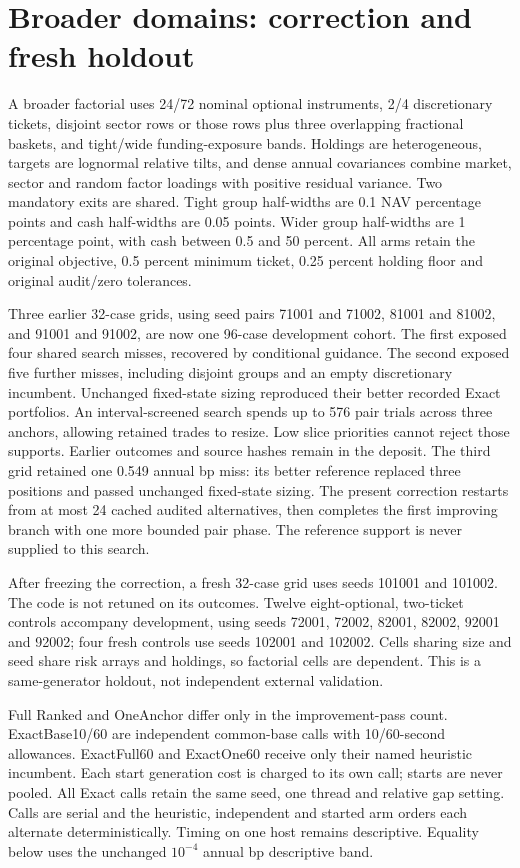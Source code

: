 \section{Broader domains: correction and fresh holdout}\label{sec:breadth}

A broader factorial uses 24/72 nominal optional instruments, 2/4 discretionary tickets, disjoint sector rows or those rows plus three overlapping fractional baskets, and tight/wide funding-exposure bands. Holdings are heterogeneous, targets are lognormal relative tilts, and dense annual covariances combine market, sector and random factor loadings with positive residual variance. Two mandatory exits are shared. Tight group half-widths are 0.1 NAV percentage points and cash half-widths are 0.05 points. Wider group half-widths are 1 percentage point, with cash between 0.5 and 50 percent. All arms retain the original objective, 0.5 percent minimum ticket, 0.25 percent holding floor and original audit/zero tolerances.

Three earlier 32-case grids, using seed pairs 71001 and 71002, 81001 and 81002, and 91001 and 91002, are now one 96-case development cohort. The first exposed four shared search misses, recovered by conditional guidance. The second exposed five further misses, including disjoint groups and an empty discretionary incumbent. Unchanged fixed-state sizing reproduced their better recorded Exact portfolios. An interval-screened search spends up to 576 pair trials across three anchors, allowing retained trades to resize. Low slice priorities cannot reject those supports. Earlier outcomes and source hashes remain in the deposit. The third grid retained one 0.549 annual bp miss: its better reference replaced three positions and passed unchanged fixed-state sizing. The present correction restarts from at most 24 cached audited alternatives, then completes the first improving branch with one more bounded pair phase. The reference support is never supplied to this search.

After freezing the correction, a fresh 32-case grid uses seeds 101001 and 101002. The code is not retuned on its outcomes. Twelve eight-optional, two-ticket controls accompany development, using seeds 72001, 72002, 82001, 82002, 92001 and 92002; four fresh controls use seeds 102001 and 102002. Cells sharing size and seed share risk arrays and holdings, so factorial cells are dependent. This is a same-generator holdout, not independent external validation.

Full Ranked and OneAnchor differ only in the improvement-pass count. ExactBase10/60 are independent common-base calls with 10/60-second allowances. ExactFull60 and ExactOne60 receive only their named heuristic incumbent. Each start generation cost is charged to its own call; starts are never pooled. All Exact calls retain the same seed, one thread and relative gap setting. Calls are serial and the heuristic, independent and started arm orders each alternate deterministically. Timing on one host remains descriptive. Equality below uses the unchanged $10^{-4}$ annual bp descriptive band.

